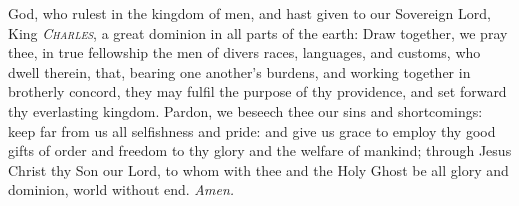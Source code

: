  God, who rulest in the kingdom of men, and hast given to our Sovereign Lord, King \textsc{\textit{Charles}}, a great dominion in all parts of the earth: Draw together, we pray thee, in true fellowship the men of divers races, languages, and customs, who dwell therein, that, bearing one another's burdens, and working together in brotherly concord, they may fulfil the purpose of thy providence, and set forward thy everlasting kingdom. Pardon, we beseech thee our sins and shortcomings: keep far from us all selfishness and pride: and give us grace to employ thy good gifts of order and freedom to thy glory and the welfare of mankind; through Jesus Christ thy Son our Lord, to whom with thee and the Holy Ghost be all glory and dominion, world without end. \textit{Amen.}

